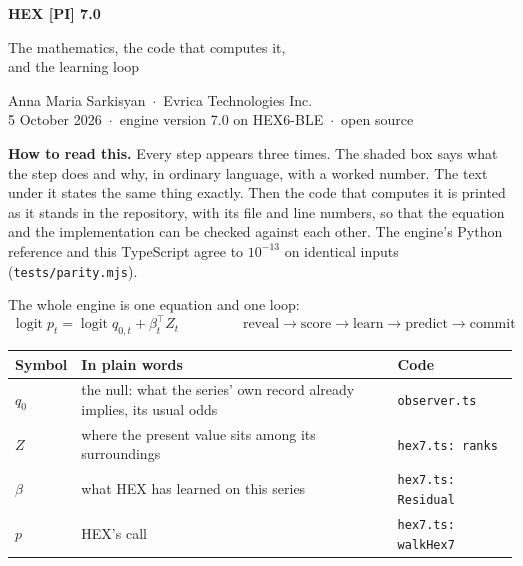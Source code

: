 \documentclass[10.5pt]{article}
\newcommand{\logit}{\operatorname{logit}}\newcommand{\med}{\operatorname{median}}
\begin{document}
\begin{center}
{\LARGE\bfseries\color{ink} HEX [PI] 7.0\par}\vspace{4pt}
{\Large\color{ink} The mathematics, the code that computes it,\\ and the learning loop\par}
\vspace{8pt}
Anna Maria Sarkisyan \,$\cdot$\, Evrica Technologies Inc.\\
5 October 2026 \,$\cdot$\, engine version 7.0 on HEX6-BLE \,$\cdot$\, open source
\end{center}

\textbf{How to read this.} Every step appears three times. The shaded box says what the step does and why, in ordinary language, with a worked number. The text under it states the same thing exactly. Then the code that computes it is printed as it stands in the repository, with its file and line numbers, so that the equation and the implementation can be checked against each other. The engine's Python reference and this TypeScript agree to $10^{-13}$ on identical inputs (\texttt{tests/parity.mjs}).

The whole engine is one equation and one loop:
\[ \boxed{\;\logit p_t=\logit q_{0,t}+\beta_t^{\top}Z_t\;}\qquad\qquad \boxed{\;\text{reveal}\rightarrow\text{score}\rightarrow\text{learn}\rightarrow\text{predict}\rightarrow\text{commit}\;} \]
\begin{center}\begin{tabular}{@{}lll@{}}\toprule
Symbol & In plain words & Code\\\midrule
$q_0$ & the null: what the series' own record already implies, its usual odds & \texttt{observer.ts}\\
$Z$ & where the present value sits among its surroundings & \texttt{hex7.ts: ranks}\\
$\beta$ & what HEX has learned on this series & \texttt{hex7.ts: Residual}\\
$p$ & HEX's call & \texttt{hex7.ts: walkHex7}\\\bottomrule\end{tabular}\end{center}
\end{document}
